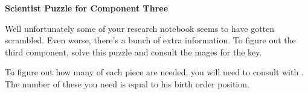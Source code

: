 \documentclass[white]{guildcamp3}
\begin{document}
\name{\wSciPuzzleThree{}} %

\large\textbf{Scientist Puzzle for Component Three}  


Well unfortunately some of your research notebook seems to have gotten scrambled. Even worse, there's a bunch of extra information. To figure out the third component, solve this puzzle and consult the mages for the key. 









To figure out how many of each piece are needed, you will need to consult with \cSpecOpOne{\intro}. The number of these you need is equal to his birth order position. 
\end{document}
